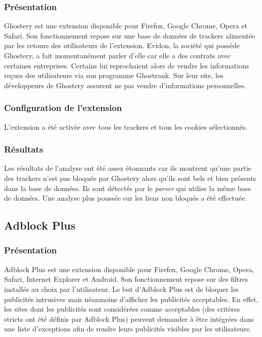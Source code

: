 \subsubsection{Présentation}
Ghostery \cite{ghostery_homepage} est une extension disponible pour Firefox, Google Chrome, Opera et Safari. Son fonctionnement repose sur une base de données de trackers alimentée par les retours des utilisateurs de l'extension. Evidon, la société qui possède Ghostery, a fait momentanément parler d'elle car elle a des contrats avec certaines entreprises. Certains lui reprochaient alors de vendre les informations reçues des utilisateurs via son programme Ghostrank. Sur leur site, les développeurs de Ghostery assurent ne pas vendre d'informations personnelles.

\subsubsection{Configuration de l'extension}
L'extension a été activée avec tous les trackers et tous les cookies sélectionnés.

\subsubsection{Résultats}
Les résultats de l'analyse ont été assez étonnants car ils montrent qu'une partie des trackers n'est pas bloquée par Ghostery alors qu'ils sont bels et bien présents dans la base de données. Ils sont détectés par le \textit{parser} qui utilise la même base de données. Une analyse plus poussée sur les liens non bloqués a été effectuée.

\subsection{Adblock Plus}
\subsubsection{Présentation}
Adblock Plus \cite{adblockplus_homepage} est une extension disponible pour Firefox, Google Chrome, Opera, Safari, Internet Explorer et Android. Son fonctionnement repose sur des filtres installés au choix par l'utilisateur. Le but d'Adblock Plus est de bloquer les publicités intrusives mais néanmoins d'afficher les publicités acceptables. En effet, les sites dont les publicités sont considérées comme acceptables (des critères stricts ont été définis par Adblock Plus) peuvent demander à être intégrées dans une liste d'exceptions afin de rendre leurs publicités visibles par les utilisateurs.

